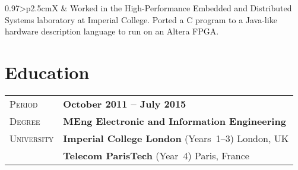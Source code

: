 \documentclass[a4paper, oneside, final]{scrartcl} %
\newcommand{\grey}{\rowcolor[gray]{.90}} %
\begin{document}
\begin{center}
\begin{tabularx}{0.97\linewidth}{>{\raggedleft\scshape}p{2.5cm}X}
& Worked in the High-Performance Embedded and Distributed Systems
laboratory at Imperial College. Ported a C program to a Java-like
hardware description language to run on an Altera FPGA.
\end{tabularx}




%


\section{Education}

\begin{tabularx}{0.97\linewidth}{>{\raggedleft\scshape}p{2.5cm}X}
\grey Period & \textbf{October 2011 -- July 2015}\\
\grey Degree & \textbf{MEng Electronic and Information Engineering}\\
\grey University & \textbf{Imperial College London}  (Years~1--3) \hfill London, UK\\
\grey & \textbf{Telecom ParisTech} (Year~4) \hfill Paris, France\\
\end{tabularx}


\end{center}
\end{document}
